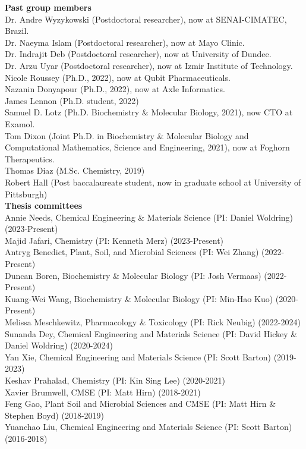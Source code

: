 \documentclass[margin,line]{res}
\begin{document}
\begin{resume}
{\bf Past group members}\\
Dr. Andre Wyzykowski (Postdoctoral researcher), now at SENAI-CIMATEC, Brazil. \\
Dr. Naeyma Islam (Postdoctoral researcher), now at Mayo Clinic. \\
Dr. Indrajit Deb (Postdoctoral researcher), now at University of Dundee. \\
Dr. Arzu Uyar (Postdoctoral researcher), now at Izmir Institute of Technology.\\
Nicole Roussey (Ph.D., 2022), now at Qubit Pharmaceuticals. \\
Nazanin Donyapour (Ph.D., 2022), now at Axle Informatics. \\
James Lennon (Ph.D. student, 2022) \\
Samuel D. Lotz (Ph.D. Biochemistry \& Molecular Biology, 2021), now CTO at Examol.\\
Tom Dixon (Joint Ph.D. in Biochemistry \& Molecular Biology and Computational Mathematics, Science and Engineering, 2021), now at Foghorn Therapeutics. \\
Thomas Diaz (M.Sc. Chemistry, 2019)\\
Robert Hall (Post baccalaureate student, now in graduate school at University of Pittsburgh)\\

{\bf Thesis committees}\\
Annie Needs, Chemical Engineering \& Materials Science (PI: Daniel Woldring) (2023-Present)\\
Majid Jafari, Chemistry (PI: Kenneth Merz) (2023-Present) \\
Antryg Benedict, Plant, Soil, and Microbial Sciences (PI: Wei Zhang) (2022-Present) \\
Duncan Boren, Biochemistry \& Molecular Biology (PI: Josh Vermaas) (2022-Present) \\
Kuang-Wei Wang, Biochemistry \& Molecular Biology (PI: Min-Hao Kuo) (2020-Present) \\
Melissa Meschkewitz, Pharmacology \& Toxicology (PI: Rick Neubig) (2022-2024) \\
Sunanda Dey, Chemical Engineering and Materials Science (PI: David Hickey \& Daniel Woldring) (2020-2024) \\
Yan Xie, Chemical Engineering and Materials Science (PI: Scott Barton) (2019-2023) \\
Keshav Prahalad, Chemistry (PI: Kin Sing Lee) (2020-2021) \\
Xavier Brumwell, CMSE (PI: Matt Hirn) (2018-2021) \\
Feng Gao, Plant Soil and Microbial Sciences and CMSE (PI: Matt Hirn \& Stephen Boyd) (2018-2019) \\
Yuanchao Liu, Chemical Engineering and Materials Science (PI: Scott Barton) (2016-2018) \\


\end{resume}
\end{document}
